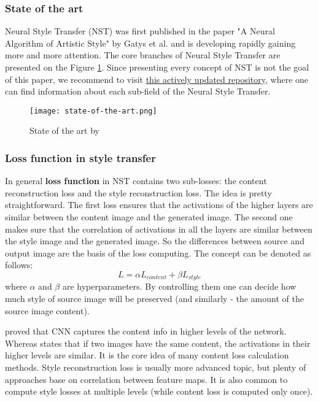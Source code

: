 \documentclass[../Main.tex]{subfiles}
\begin{document}
    \subsubsection{State of the art}
    Neural Style Transfer (NST) was first published in the paper "A Neural Algorithm of Artistic Style" by Gatys et al. \cite{gatys2015neural} and is developing rapidly gaining more and more attention. The core branches of Neural Style Transfer are presented on the Figure \ref{fig:state-of-the-art}. Since presenting every concept of NST is not the goal of this paper, we recommend to visit \href{https://github.com/ycjing/Neural-Style-Transfer-Papers}{this actively updated repository}, where one can find information about each sub-field of the Neural Style Transfer.  \\
    \begin{figure}[ht!]
        \centering
        \texttt{[image: state-of-the-art.png]}
        \caption{State of the art by \cite{nstpapersrepo}}
        \label{fig:state-of-the-art}
    \end{figure}
    
    \subsubsection{Loss function in style transfer}
    In general \textbf{loss function} in NST contains two sub-losses: the content reconstruction loss and the style reconstruction loss. The idea is pretty straightforward. The first loss ensures that the activations of the higher layers are similar between the content image and the generated image. The second one makes sure that the correlation of activations in all the layers are similar between the style image and the generated image. So the differences between source and output image are the basis of the loss computing.
    The concept can be denoted as follows:
    \[L= \alpha L_{content} + \beta L_{style}\]
    where $\alpha$ and $\beta$ are hyperparameters. By controlling them one can decide how much style of source image will be preserved (and similarly - the amount of the source image content). 
    
    \cite{gatys2015neural} proved that CNN captures the content info in higher levels of the network. Whereas \cite{zeiler2013visualizing} states that if two images have the same content, the activations in their higher levels are similar. It is the core idea of many content loss calculation methods.
    Style reconstruction loss is usually more advanced topic, but plenty of approaches base on correlation between feature maps. It is also common to compute style losses at multiple levels (while content loss is computed only once).
\end{document}
